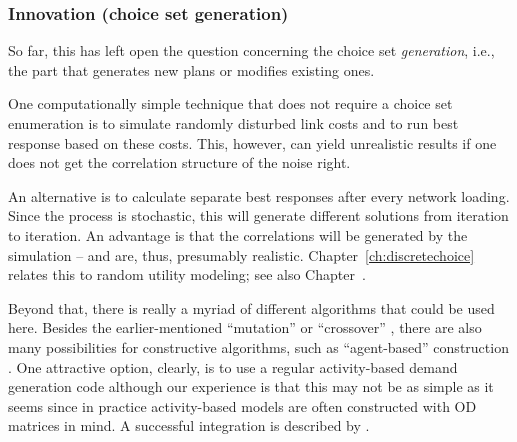 \subsubsection{Innovation (choice set generation)}

So far, this has left open the question concerning the choice set
\emph{generation}, i.e., the part that generates new plans or modifies
existing ones.  

One computationally simple technique that does not require a choice
set enumeration is to simulate randomly disturbed link costs and to
run best response based on these costs. This, however, can yield
unrealistic results if one does not get the correlation structure of
the noise right.

An alternative is to calculate separate best responses after every
network loading.  Since the process is stochastic, this will generate
different solutions from iteration to iteration.  An advantage is that
the correlations will be generated by the simulation -- and are, thus,
presumably realistic. Chapter~\ref{ch:discretechoice}
relates this to random utility modeling; see also Chapter~.

Beyond that, there is really a myriad of different algorithms that
could be used here.  Besides the earlier-mentioned ``mutation''
\citep{BalmerRaneyEtAl2005act-times} or ``crossover''
\citep{CharyparNagel2005ga4acts,MeisterBalmerEtc2006planomatIatbr},
there are also many possibilities for constructive algorithms, such as
``agent-based'' construction
\citep{ZhuLevinsonZhang2008AgentBasedRouteChoice2}.  One attractive
option, clearly, is to use a regular activity-based demand generation
code \citep[e.g.,][]{BowmanEtc1999PortlandActs,MillerRoordaTASHA}
although our experience is that this may not be as simple as it seems
\citep{RieserNagelEtc2007early-berlin-trr} since in practice
activity-based models are often constructed with OD matrices in mind.  
A successful integration is described by 
\cite{ZiemkeNagelBhatIntegratingCemdapMatsimTransferability}.



